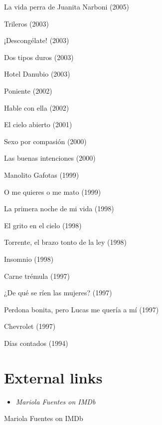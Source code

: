La vida perra de Juanita Narboni (2005)

Trileros (2003)

¡Descongélate! (2003)

Dos tipos duros (2003)

Hotel Danubio (2003)

Poniente (2002)

Hable con ella (2002)

El cielo abierto (2001)

Sexo por compasión (2000)

Las buenas intenciones (2000)

Manolito Gafotas (1999)

O me quieres o me mato (1999)

La primera noche de mi vida (1998)

El grito en el cielo (1998)

Torrente, el brazo tonto de la ley (1998)

Insomnio (1998)

Carne trémula (1997)

¿De qué se ríen las mujeres? (1997)

Perdona bonita, pero Lucas me quería a mí (1997)

Chevrolet (1997)

Días contados (1994)

\section{External links}\label{external-links}

\begin{itemize}
\item
  \emph{Mariola Fuentes on IMDb}
\end{itemize}

Mariola Fuentes on IMDb
